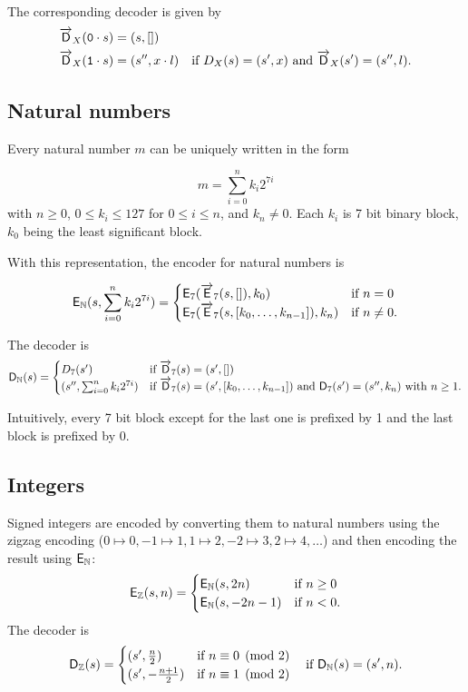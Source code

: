 \noindent The corresponding decoder is given by
\begin{align*}
\overrightarrow{\mathsf{D}}_X(\mathtt{0} \cdot s) &= (s,[])\\
\overrightarrow{\mathsf{D}}_X(\mathtt{1} \cdot s) &= (s'', x \cdot l) \quad \text{if $D_X(s) = (s', x)$ and $\overrightarrow{\mathsf{D}}_X(s') = (s'', l).$}
\end{align*}

\subsection{Natural numbers}
Every natural number $m$ can be uniquely written in the form

$$
m = \sum_{i=0}^{n}k_i2^{7i}
$$
with $n \geq 0$, $0 \leq k_i \leq 127$ for $0 \leq i \leq n$, and $k_n \ne 0$.
Each $k_i$ is 7 bit binary block, $k_0$ being the least significant block.

\medskip
\noindent With this representation, the encoder for natural numbers is

$$
\mathsf{E}_{\mathbb{N}} (s, \sum_{i=0}^{n}k_i2^{7i}) =
\begin{cases}
  \mathsf{E}_7(\overrightarrow{\mathsf{E}}_7(s, []), k_{0}) & \text{if } n = 0 \\
  \mathsf{E}_7(\overrightarrow{\mathsf{E}}_7(s, [k_0, \ldots, k_{n-1}]), k_{n}) & \text{if } n \ne 0.
\end{cases}
$$

\noindent The decoder is
$$
\mathsf{D}_{\mathbb{N}}(s) =
\begin{cases}
  D_7(s') & \text{if $\overrightarrow{\mathsf{D}}_7(s) = (s',[])$} \\
  (s'', \sum_{i=0}^{n}k_i2^{7i}) & \text{if $\overrightarrow{\mathsf{D}}_7(s) = (s', [k_0, \ldots, k_{n-1}])$ and $\mathsf{D}_7(s') = (s'', k_{n})$ with $n\geq 1$}.
\end{cases}
$$

\noindent Intuitively, every 7 bit block except for the last one is prefixed by 1
and the last block is prefixed by 0.

\subsection{Integers}
Signed integers are encoded by converting them to natural numbers using the
zigzag encoding ($0 \mapsto 0, -1 \mapsto 1, 1 \mapsto 2, -2 \mapsto 3, 2
\mapsto 4, \ldots$) and then encoding the result using $\mathsf{E}_{\mathbb{N}}$:
$$
\mathsf{E}_{\mathbb{Z}} (s, n) =
\begin{cases}
  \mathsf{E}_{\mathbb{N}}(s, 2n) & \text{if $n \geq 0$}\\
  \mathsf{E}_{\mathbb{N}}(s, -2n-1) & \text{if $n < 0$}.
\end{cases}
$$
The decoder is
$$
\mathsf{D}_{\mathbb{Z}}(s) =
\begin{cases}
  (s', \frac{n}{2}) & \text{if $n \equiv 0 \pmod 2$}\\
  (s', -\frac{n+1}{2}) & \text{if $n \equiv 1 \pmod 2$}
\end{cases} \quad\text{if $\mathsf{D}_{\mathbb{N}}(s) = (s', n)$}.
$$


